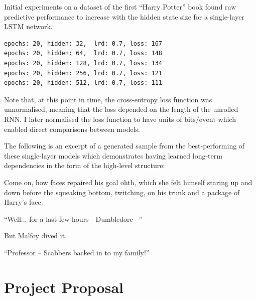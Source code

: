 \documentclass[12pt,a4paper,twoside,openright]{report}
\begin{document}
Initial experiments on a dataset of the first ``Harry Potter'' book found raw
predictive performance to increase with the hidden state size for a single-layer
LSTM network.

\begin{verbatim}
epochs: 20, hidden: 32,  lrd: 0.7, loss: 167
epochs: 20, hidden: 64,  lrd: 0.7, loss: 148
epochs: 20, hidden: 128, lrd: 0.7, loss: 134
epochs: 20, hidden: 256, lrd: 0.7, loss: 121
epochs: 20, hidden: 512, lrd: 0.7, loss: 111
\end{verbatim}

Note that, at this point in time, the cross-entropy loss function was
unnormalised, meaning that the loss depended on the length of the unrolled RNN.
I later normalised the loss function to have units of
$\mathrm{bits}/\mathrm{event}$ which enabled direct comparisons between models.

The following is an excerpt of a generated sample from the best-performing of
these single-layer models which demonstrates having learned long-term
dependencies in the form of the high-level structure:

\begin{displayquote}
Come on, how faces repaired his goal ohth, which she felt himself staring up and
down before the squeaking bottom, twitching, on his trunk and a package of
Harry's face.

``Well... for a last few hours - Dumbledore --''

But Malfoy dived it.

``Professor -- Scabbers backed in to my family!''
\end{displayquote}
\vspace{4mm}

\chapter{Project Proposal}


\end{document}
